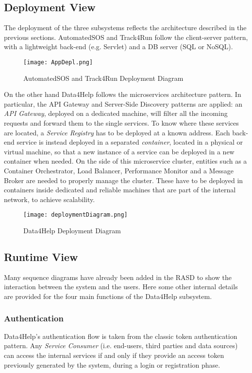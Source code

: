\subsection{Deployment View}
The deployment of the three subsystems reflects the architecture described in the previous sections. AutomatedSOS and Track4Run follow the client-server pattern, with a lightweight back-end (e.g. Servlet) and a DB server (SQL or NoSQL).

\FloatBarrier
\begin{figure}[!h]
	\centering
	\texttt{[image: AppDepl.png]}
	\caption{AutomatedSOS and Track4Run Deployment Diagram}
\end{figure}
\FloatBarrier

On the other hand Data4Help follows the microservices architecture pattern. In particular, the API Gateway and Server-Side Discovery patterns are applied: an \textit{API Gateway}, deployed on a dedicated machine, will filter all the incoming requests and forward them to the single services. To know where these services are located, a \textit{Service Registry} has to be deployed at a known address. Each back-end service is instead deployed in a separated \textit{container}, located in a physical or virtual machine, so that 
a new instance of a service can be deployed in a new container when needed. On the side of this microservice cluster, entities such as a Container Orchestrator, Load Balancer, Performance Monitor and a Message Broker are needed to properly manage the cluster. These have to be deployed in containers inside dedicated and reliable machines that are part of the internal network, to achieve scalability.

\FloatBarrier
\begin{figure}[!h]
	\centering
	\texttt{[image: deploymentDiagram.png]}
	\caption{Data4Help Deployment Diagram}
\end{figure}
\FloatBarrier

\subsection{Runtime View}
Many sequence diagrams have already been added in the RASD to show the interaction between the system and the users. Here some other internal details are provided for the four main functions of the Data4Help subsystem.

\subsubsection{Authentication}
Data4Help's authentication flow is taken from the classic token authentication pattern. Any \textit{Service Consumer} (i.e. end-users, third parties and data sources) can access the internal services if and only if they provide an access token previously generated by the system, during a login or registration phase.

